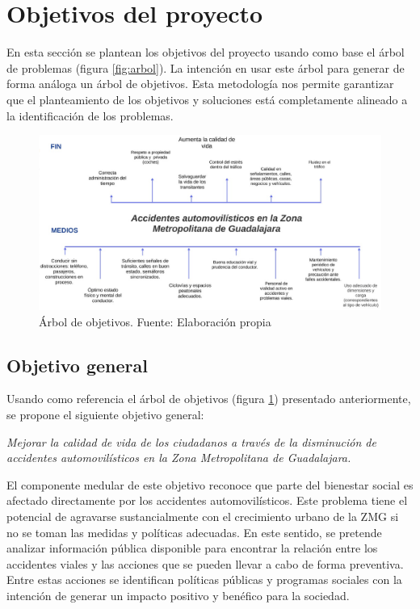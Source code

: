 \documentclass{article}
\newcommand{\forceindent}{\leavevmode{\parindent=1em\indent}}
\begin{document}
\newpage
\section{Objetivos del proyecto}\label{sec:objs}

En esta sección se plantean los objetivos del proyecto usando como base el
árbol de problemas (figura \ref{fig:arbol}). La intención en usar este árbol para generar
de forma análoga un árbol de objetivos. Esta metodología nos permite garantizar que
el planteamiento de los objetivos y soluciones está completamente alineado a la identificación
de los problemas. 

	\begin{figure}[H]\centering
	\includegraphics[width=1\textwidth]{resources/img/arbol_de_objetivos.png}
	\caption{\label{fig:arbol_obj} Árbol de objetivos. Fuente: Elaboración propia}
    \end{figure}


\subsection{Objetivo general}\label{subsec:general-objs}

Usando como referencia el árbol de objetivos (figura \ref{fig:arbol_obj}) presentado anteriormente, se propone el siguiente objetivo general:

\forceindent \textit{Mejorar la calidad de vida de los ciudadanos a través de la disminución de accidentes automovilísticos en la
Zona Metropolitana de Guadalajara.}

El componente medular de este objetivo reconoce que parte del bienestar social es afectado directamente por los accidentes automovilísticos. Este problema tiene el potencial de agravarse sustancialmente con el crecimiento urbano de la ZMG si no se toman las medidas y políticas adecuadas. En este sentido, se pretende analizar información pública disponible para encontrar la relación entre los accidentes viales y las acciones que se pueden llevar a cabo de forma preventiva. Entre estas acciones se identifican políticas públicas y programas sociales con la intención de generar un impacto positivo y benéfico para la sociedad. 
\end{document}
